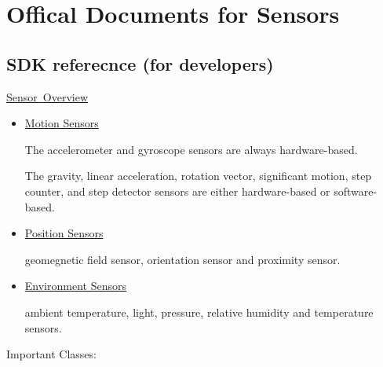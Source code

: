 

\section{Offical Documents for Sensors}

\subsection{SDK referecnce (for developers)}


\href{https://developer.android.com/guide/topics/sensors/sensors_overview.html#sensors-monitor} {Sensor~Overview}
\begin{itemize}
\item
  \href{https://developer.android.com/guide/topics/sensors/sensors_motion.html}
  {Motion Sensors}
  
  The accelerometer and gyroscope sensors are always hardware-based.
  
  The gravity, linear acceleration, rotation vector, significant motion, step
  counter, and step detector sensors are either hardware-based or
  software-based.
   
  
\item
  \href{https://developer.android.com/guide/topics/sensors/sensors_position.html}
  {Position Sensors}

  geomegnetic field sensor, orientation sensor and proximity sensor.

\item
  \href{https://developer.android.com/guide/topics/sensors/sensors_environment.html}
  {Environment Sensors}

  ambient temperature, light, pressure, relative humidity and temperature sensors.
\end{itemize}


Important Classes:

